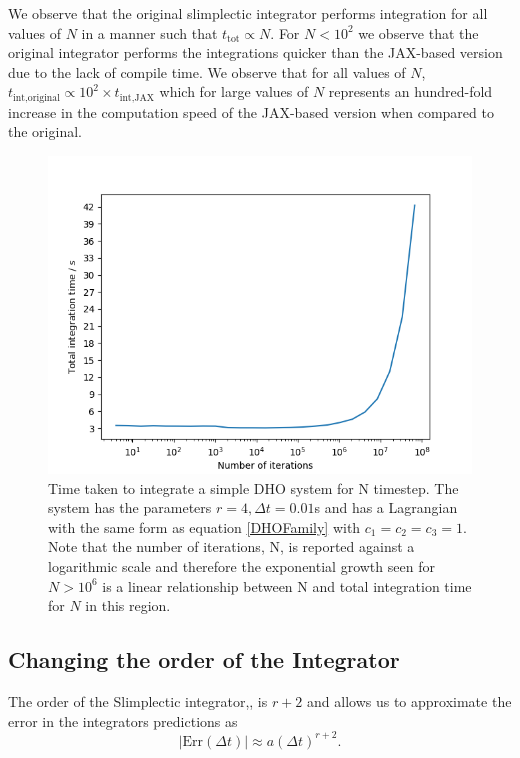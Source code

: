 \documentclass[10pt]{iopart}
\begin{document}
We observe that the original slimplectic integrator performs integration for all values of $N$ in a manner such that $t_{\textrm{tot}} \propto N$. For $N<10^2$ we observe that the original integrator performs the integrations quicker than the JAX-based version due to the lack of compile time. We observe that for all values of $N$, $t_{\textrm{int,original}} \propto 10^2\times t_{\textrm{int,JAX}}$ which for large values of $N$ represents an hundred-fold increase in the computation speed of the JAX-based version when compared to the original.

\begin{figure}
	\label{nplot}
	\centering
	\includegraphics[width=\columnwidth]{NPlot.jpg}
	\caption{Time taken to integrate a simple DHO system for N timestep. The system has the parameters $r=4, \Delta t=0.01$s and has a Lagrangian with the same form as equation \ref{DHOFamily} with $c_1=c_2=c_3=1$. Note that the number of iterations, N, is reported against a logarithmic scale and therefore the exponential growth seen for $N>10^6$ is a linear relationship between N and total integration time for $N$ in this region.}
\end{figure}

\subsection{Changing the order of the Integrator}
The order of the Slimplectic integrator,\cite{Tsang_Slimplectic}, is $r+2$ and allows us to approximate the error in the integrators predictions as
\begin{equation}
	|\textrm{Err}(\Delta t)| \approx a(\Delta t)^{r+2}.
\end{equation}
\end{document}
